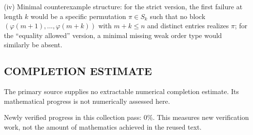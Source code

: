 (iv) Minimal counterexample structure: for the strict version, the first failure at length $k$ would be a specific permutation $\pi\in S_k$ such that no block $(\varphi(m+1),...,\varphi(m+k))$ with $m+k\le n$ and distinct entries realizes $\pi$; for the ``equality allowed'' version, a minimal missing weak order type would similarly be absent.


\subsection*{COMPLETION ESTIMATE}
The primary source supplies no extractable numerical completion estimate. Its mathematical progress is not numerically assessed here.

Newly verified progress in this collection pass: $0\%$. This measures new verification work, not the amount of mathematics achieved in the reused text.
